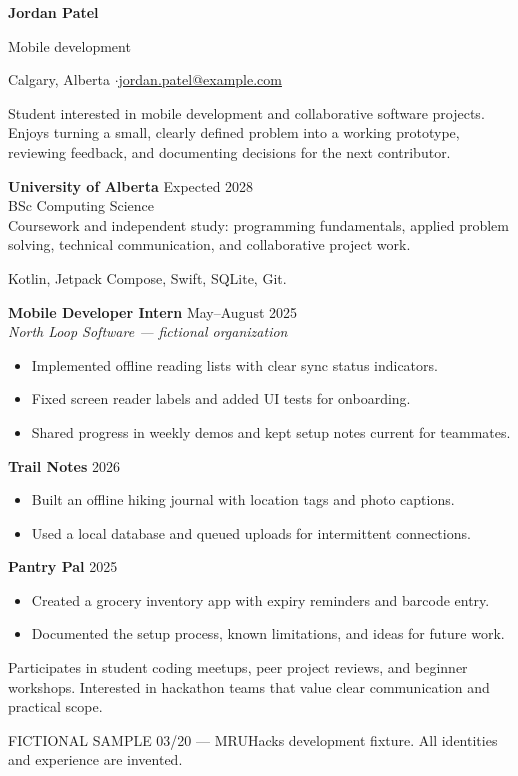 
{\Huge\bfseries Jordan Patel}\par
{\large\color{accent} Mobile development}\par
Calgary, Alberta \enspace$\cdot$\enspace \href{mailto:jordan.patel@example.com}{jordan.patel@example.com}

Student interested in mobile development and collaborative software projects.
Enjoys turning a small, clearly defined problem into a working prototype,
reviewing feedback, and documenting decisions for the next contributor.

\textbf{University of Alberta} \hfill Expected 2028\\
BSc Computing Science\\
Coursework and independent study: programming fundamentals, applied problem solving,
technical communication, and collaborative project work.

Kotlin, Jetpack Compose, Swift, SQLite, Git.

\textbf{Mobile Developer Intern} \hfill May--August 2025\\
\textit{North Loop Software --- fictional organization}
\begin{itemize}
\item Implemented offline reading lists with clear sync status indicators.
\item Fixed screen reader labels and added UI tests for onboarding.
\item Shared progress in weekly demos and kept setup notes current for teammates.
\end{itemize}

\textbf{Trail Notes} \hfill 2026
\begin{itemize}
\item Built an offline hiking journal with location tags and photo captions.
\item Used a local database and queued uploads for intermittent connections.
\end{itemize}
\textbf{Pantry Pal} \hfill 2025
\begin{itemize}
\item Created a grocery inventory app with expiry reminders and barcode entry.
\item Documented the setup process, known limitations, and ideas for future work.
\end{itemize}

Participates in student coding meetups, peer project reviews, and beginner workshops.
Interested in hackathon teams that value clear communication and practical scope.

\vfill
{\footnotesize\color{gray} FICTIONAL SAMPLE 03/20 --- MRUHacks development fixture.
All identities and experience are invented.}

